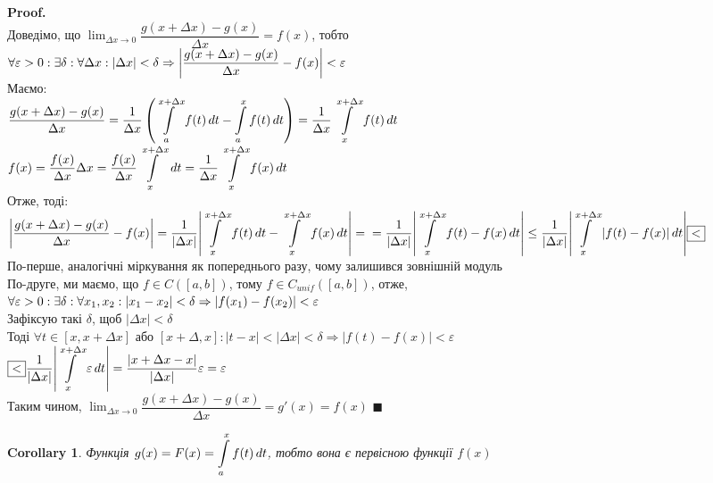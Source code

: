 \documentclass[a4paper, 14pt]{extarticle}
\def\huge{\displaystyle}
\theoremstyle{theoremdd}
\theoremstyle{theoremdd}
\theoremstyle{theoremdd}
\theoremstyle{theoremdd}
\theoremstyle{theoremdd}
\theoremstyle{theoremdd}
\theoremstyle{theoremdd}
\theoremstyle{theoremdd}
\newtheorem{corollary}[theorem]{Corollary}
\newenvironment{pf}{\vspace*{-3mm} \textbf{Proof. \\}}{$\blacksquare$}
\begin{document}
\begin{pf}
Доведімо, що $\huge \lim_{\Delta x \to 0} \dfrac{g(x+\Delta x) - g(x)}{\Delta x} = f(x)$, тобто\\
$\forall \varepsilon > 0: \exists \delta: \forall \Delta x: |\Delta x| < \delta \Rightarrow \abs{\dfrac{g(x+\Delta x) - g(x)}{\Delta x} - f(x)} < \varepsilon$\\
Маємо:\\
$\dfrac{g(x+\Delta x) - g(x)}{\Delta x} = \huge \dfrac{1}{\Delta x} \left( \int\displaylimits_a^{x+\Delta x} f(t)\,dt - \int\displaylimits_a^x f(t)\,dt \right) = \dfrac{1}{\Delta x} \int\displaylimits_{x}^{x+\Delta x} f(t)\,dt$\\
$f(x) = \huge \dfrac{f(x)}{\Delta x} \Delta x = \dfrac{f(x)}{\Delta x} \int\displaylimits_x^{x+\Delta x} \,dt = \dfrac{1}{\Delta x} \int\displaylimits_x^{x+\Delta x} f(x)\,dt$\\
Отже, тоді:\\
$\huge \abs{\dfrac{g(x+\Delta x) - g(x)}{\Delta x} - f(x)} = \dfrac{1}{|\Delta x|} \abs{\int\displaylimits_x^{x+\Delta x} f(t)\,dt - \int\displaylimits_x^{x+\Delta x} f(x)\,dt}= \\ = \dfrac{1}{|\Delta x|} \abs{\int\displaylimits_x^{x+\Delta x} f(t)-f(x)\,dt} \leq \dfrac{1}{|\Delta x|} \abs{\int\displaylimits_x^{x+\Delta x} |f(t)-f(x)| \,dt} \boxed{<}$\\
По-перше, аналогічні міркування як попереднього разу, чому залишився зовнішній модуль\\
По-друге, ми маємо, що $f \in C([a,b])$, тому $f \in C_{unif}([a,b])$, отже,\\
$\forall \varepsilon > 0: \exists \delta: \forall x_1,x_2: |x_1-x_2| < \delta \Rightarrow \abs{f(x_1) - f(x_2)} < \varepsilon$\\
Зафіксую такі $\delta$, щоб $|\Delta x| < \delta$\\
Тоді $\forall t \in [x,x+\Delta x]$ або $[x+\Delta, x]: |t-x|<|\Delta x|<\delta \Rightarrow |f(t)-f(x)|<\varepsilon$\\
$\boxed{<} \dfrac{1}{|\Delta x|} \huge \abs{\int\displaylimits_x^{x+\Delta x} \varepsilon \,dt} = \dfrac{\abs{x+\Delta x -x}}{|\Delta x|} \varepsilon = \varepsilon$\\
Таким чином, $\huge \lim_{\Delta x \to 0} \dfrac{g(x+\Delta x) - g(x)}{\Delta x} = g'(x) = f(x)$
\end{pf}
\begin{corollary}
Функція $g(x) = F(x) = \huge\int\displaylimits_a^x f(t)\,dt$, тобто вона є первісною  функції $f(x)$
\end{corollary}
\end{document}
